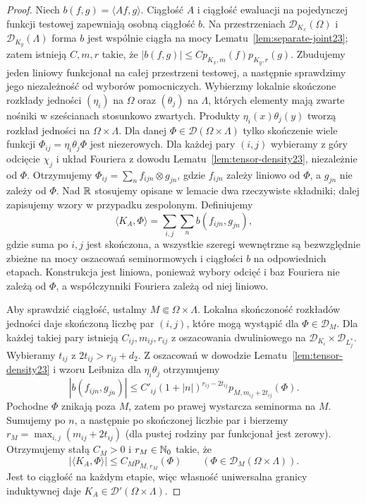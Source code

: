 \begin{proof}
Niech $b(f,g)=\langle Af,g\rangle$. Ciągłość $A$
i ciągłość ewaluacji na pojedynczej funkcji testowej
zapewniają osobną ciągłość $b$. Na przestrzeniach
$\mathcal D_{K_x}(\Omega)$ i $\mathcal D_{K_y}(\Lambda)$
forma $b$ jest wspólnie ciągła na mocy
Lematu~\ref{lem:separate-joint23}; zatem istnieją
$C,m,r$ takie, że
$|b(f,g)|\le C p_{K_x,m}(f)p_{K_y,r}(g)$.
Zbudujemy jeden liniowy funkcjonał na całej przestrzeni
testowej, a następnie sprawdzimy jego niezależność
od wyborów pomocniczych. Wybierzmy lokalnie skończone
rozkłady jedności $(\eta_i)$ na $\Omega$ oraz
$(\theta_j)$ na $\Lambda$, których elementy mają zwarte
nośniki w sześcianach stosunkowo zwartych. Produkty
$\eta_i(x)\theta_j(y)$ tworzą rozkład jedności na
$\Omega\times\Lambda$. Dla danej
$\Phi\in\mathcal D(\Omega\times\Lambda)$ tylko skończenie
wiele funkcji $\Phi_{ij}=\eta_i\theta_j\Phi$ jest niezerowych.
Dla każdej pary $(i,j)$ wybieramy z góry odcięcie
$\chi_j$ i układ Fouriera z dowodu
Lematu~\ref{lem:tensor-density23}, niezależnie od $\Phi$.
Otrzymujemy $\Phi_{ij}=\sum_n f_{ijn}\otimes g_{jn}$,
gdzie $f_{ijn}$ zależy liniowo od $\Phi$,
a $g_{jn}$ nie zależy od $\Phi$.
Nad $\mathbb R$ stosujemy opisane w lemacie dwa rzeczywiste
składniki; dalej zapisujemy wzory w przypadku zespolonym.
Definiujemy
\[
 \langle K_A,\Phi\rangle=\sum_{i,j}\sum_n b(f_{ijn},g_{jn}),
\]
gdzie suma po $i,j$ jest skończona, a wszystkie szeregi
wewnętrzne są bezwzględnie zbieżne na mocy oszacowań
seminormowych i ciągłości $b$ na odpowiednich etapach.
Konstrukcja jest liniowa, ponieważ wybory odcięć i baz
Fouriera nie zależą od $\Phi$, a współczynniki Fouriera
zależą od niej liniowo.

Aby sprawdzić ciągłość, ustalmy $M\Subset\Omega\times\Lambda$.
Lokalna skończoność rozkładów jedności daje skończoną
liczbę par $(i,j)$, które mogą wystąpić dla
$\Phi\in\mathcal D_M$. Dla każdej takiej pary istnieją $C_{ij},m_{ij},r_{ij}$
z oszacowania dwuliniowego na $\mathcal D_{K_i}
\times\mathcal D_{L_j^*}$. Wybieramy $t_{ij}$ z
$2t_{ij}>r_{ij}+d_2$. Z oszacowań w dowodzie
Lematu~\ref{lem:tensor-density23} i wzoru Leibniza
dla $\eta_i\theta_j$ otrzymujemy
\[
 |b(f_{ijn},g_{jn})|\le C'_{ij}
 (1+|n|)^{r_{ij}-2t_{ij}}
 p_{M,m_{ij}+2t_{ij}}(\Phi).
\]
Pochodne $\Phi$ znikają poza $M$, zatem po prawej
wystarcza seminorma na $M$. Sumujemy po $n$,
a następnie po skończonej liczbie par i bierzemy
$r_M=\max_{i,j}(m_{ij}+2t_{ij})$ (dla pustej
rodziny par funkcjonał jest zerowy). Otrzymujemy
stałą $C_M>0$ i $r_M\in\mathbb N_0$ takie, że
\[
 |\langle K_A,\Phi\rangle|\le C_M p_{M,r_M}(\Phi)
 \qquad (\Phi\in\mathcal D_M(\Omega\times\Lambda)).
\]
Jest to ciągłość na każdym etapie, więc własność
uniwersalna granicy induktywnej daje
$K_A\in\mathcal D'(\Omega\times\Lambda)$.


\end{proof}
